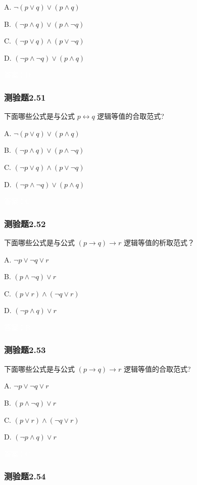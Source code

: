 \documentclass[UTF8, heading=true]{ctexart}
\begin{document}
A. $\neg(p \vee q) \vee(p \wedge q)$

B. $(\neg p \wedge q) \vee(p \wedge \neg q)$

C. $(\neg p \vee q) \wedge(p \vee \neg q)$

D. $(\neg p \wedge \neg q) \vee(p \wedge q)$

\textcolor{white}{答案：D}

\subsubsection{测验题2.51}

下面哪些公式是与公式 $p \leftrightarrow q$ 逻辑等值的合取范式?

A. $\neg(p \vee q) \vee(p \wedge q)$

B. $(\neg p \wedge q) \vee(p \wedge \neg q)$

C. $(\neg p \vee q) \wedge(p \vee \neg q)$

D. $(\neg p \wedge \neg q) \vee(p \wedge q)$

\textcolor{white}{答案：C}

\subsubsection{测验题2.52}

下面哪些公式是与公式 $(p \rightarrow q) \rightarrow r$ 逻辑等值的析取范式？

A. $\neg p \vee \neg q \vee r$

B. $(p \wedge \neg q) \vee r$

C. $(p \vee r) \wedge(\neg q \vee r)$

D.  $(\neg p \wedge q) \vee r$

\textcolor{white}{答案：B}

\subsubsection{测验题2.53}

下面哪些公式是与公式 $(p \rightarrow q) \rightarrow r$ 逻辑等值的合取范式?

A. $ \neg p \vee \neg q \vee r$

B. $(p \wedge \neg q) \vee r$

C. $(p \vee r) \wedge(\neg q \vee r)$

D. $(\neg p \wedge q) \vee r$

\textcolor{white}{答案：C}

\subsubsection{测验题2.54}
\end{document}
